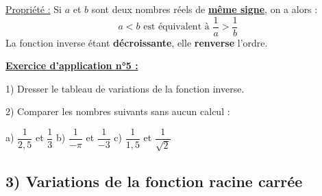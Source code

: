 \documentclass[12pt]{article}
\begin{document}
\begin{mdframed}[
    linewidth=1pt,
    roundcorner=5pt,
    linecolor=Red,
    innertopmargin=10pt,
    innerbottommargin=10pt
]
{\color{red}
\underline{Propriété :}
Si $a$ et $b$ sont deux nombres réels de \textbf{\underline{même signe}}, on a alors :
\[
a<b \text{\ \ \ est équivalent à \ \ } \dfrac{1}{a} > \dfrac{1}{b}
\]
La fonction inverse étant \textbf{décroissante}, elle \textbf{renverse} l'ordre.
}
\end{mdframed}

\begin{mdframed}[
    linewidth=1pt,
    linecolor=RoyalBlue,
    innertopmargin=10pt,
    innerbottommargin=10pt
]
{\color{RoyalBlue}\textbf{\underline{Exercice d'application n°5 :}}}

\vspace{10pt}
1) Dresser le tableau de variations de la fonction inverse.

\vspace{10pt}
2) Comparer les nombres suivants sans aucun calcul :

\vspace{5pt}
\hspace{1cm}a) $\dfrac{1}{2,5}$ et $\dfrac{1}{3}$ \hspace{1cm}b) $\dfrac{1}{-\pi}$ et 
$\dfrac{1}{-3}$ \hspace{1cm}c) $\dfrac{1}{1,5}$ et $\dfrac{1}{\sqrt{2}}$

\vspace{6cm}
\end{mdframed}

\vspace{20pt}


\subsection*{\hspace{1cm} 3) Variations de la fonction racine carrée}
\end{document}
